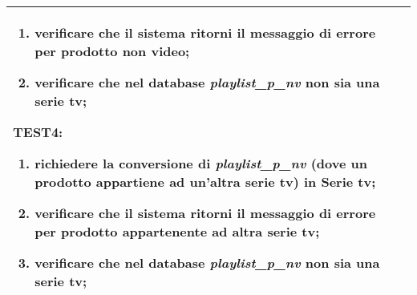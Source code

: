 \begin{table}[hb]
\begin{tabular}{ |p{2cm}|p{10cm}|  }
\begin{enumerate}[nosep, topsep=0pt]
            \item verificare che il sistema ritorni il messaggio di errore per prodotto non video;
            \item verificare che nel database \emph{playlist\_p\_nv} non sia una serie tv;
        \end{enumerate}
        \vspace{0.5cm} TEST4:
        \begin{enumerate}[nosep, topsep=0pt]
            \item richiedere la conversione di \emph{playlist\_p\_nv} (dove un prodotto appartiene ad un'altra serie tv) in Serie tv;
            \item verificare che il sistema ritorni il messaggio di errore per prodotto appartenente ad altra serie tv;
            \item verificare che nel database \emph{playlist\_p\_nv} non sia una serie tv;
        \end{enumerate}
        \\\hline
    \end{tabular}
\end{table}


